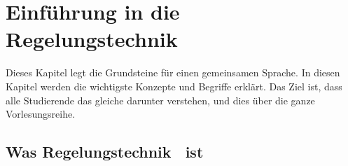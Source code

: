 	
\chapter{Einführung in die Regelungstechnik}

	Dieses Kapitel legt die Grundsteine für einen gemeinsamen Sprache. In diesen Kapitel werden die wichtigste Konzepte und Begriffe erklärt. Das Ziel ist, dass alle Studierende das gleiche darunter verstehen, und dies über die ganze Vorlesungsreihe.
	
\section{Was \glqq Regelungstechnik\grqq~ ist}